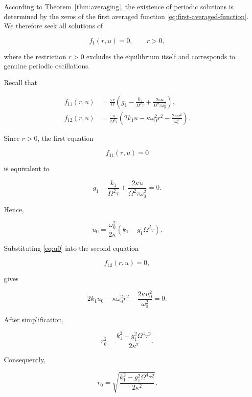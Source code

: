 \documentclass[11pt,reqno]{amsart}
\theoremstyle{plain}
\theoremstyle{definition}
\theoremstyle{remark}
\begin{document}
According to Theorem~\ref{thm:averaging}, the existence of periodic
solutions is determined by the zeros of the first averaged function
\eqref{eq:first-averaged-function}. We therefore seek all solutions of

\[
f_1(r,u)=0,
\qquad r>0,
\]

where the restriction $r>0$ excludes the equilibrium itself and
corresponds to genuine periodic oscillations.

Recall that

\begin{equation}
\label{eq:averaged-components}
\begin{aligned}
f_{11}(r,u)
&=
\frac{\pi r}{\Omega}
\left(
g_1
-\frac{k_1}{\Omega^2\tau}
+\frac{2\kappa u}
{\Omega^2\tau\omega_0^2}
\right),
\\[2mm]
f_{12}(r,u)
&=
\frac{\pi}{\Omega^3\tau}
\left(
2k_1u
-\kappa\omega_0^2r^2
-\frac{2\kappa u^2}{\omega_0^2}
\right).
\end{aligned}
\end{equation}

Since $r>0$, the first equation

\[
f_{11}(r,u)=0
\]

is equivalent to

\[
g_1
-
\frac{k_1}{\Omega^2\tau}
+
\frac{2\kappa u}
{\Omega^2\tau\omega_0^2}
=
0.
\]

Hence,

\begin{equation}
\label{eq:u0}
\boxed{
u_0
=
\frac{\omega_0^2}{2\kappa}
\left(
k_1-g_1\Omega^2\tau
\right).
}
\end{equation}

Substituting \eqref{eq:u0} into the second equation

\[
f_{12}(r,u)=0,
\]

gives

\[
2k_1u_0
-
\kappa\omega_0^2r^2
-
\frac{2\kappa u_0^2}{\omega_0^2}
=
0.
\]

After simplification,

\begin{equation}
\label{eq:r0-square}
\boxed{
r_0^2
=
\frac{
k_1^2-g_1^2\Omega^4\tau^2
}
{2\kappa^2}.
}
\end{equation}

Consequently,

\begin{equation}
\label{eq:r0}
\boxed{
r_0
=
\sqrt{
\frac{
k_1^2-g_1^2\Omega^4\tau^2
}
{2\kappa^2}
}.
}
\end{equation}
\end{document}
